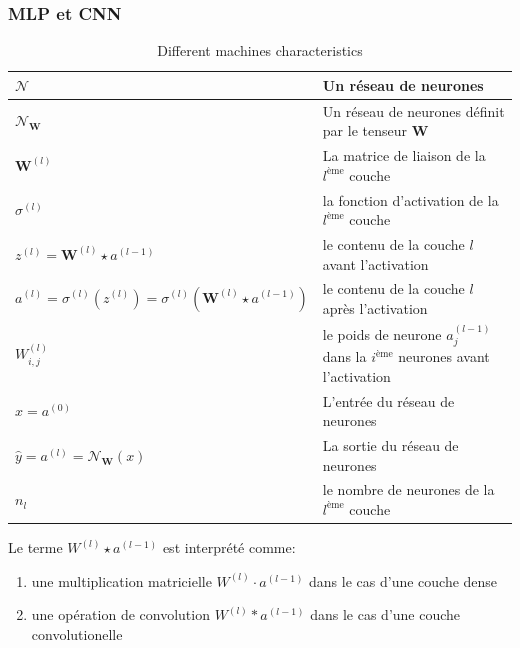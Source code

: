 \subsubsection{MLP et CNN}
\begin{table}[ht]
	\centering
	\begin{tabularx}{\textwidth}{| X | X |}
		
		\hline
		$\mathcal{N}$          & Un réseau de neurones \\ 
		\hline
		$\mathcal{N}_{\boldsymbol{W}}$          & Un réseau de neurones définit par le tenseur $\boldsymbol{W}$      \\ \hline
		$\boldsymbol{W}^{(l)}$          & La matrice de liaison de la $l^\text{ème}$ couche         \\
		\hline
		$\sigma^{(l)}$& la fonction d'activation de la $l^\text{ème}$ couche \\
				\hline
		$z^{(l)}=\boldsymbol{W}^{(l)}\star a^{(l-1)}$ & le contenu de la couche $l$ avant l'activation\\
		\hline
		$a^{(l)}=\sigma^{(l)}({z^{(l)}})=\sigma^{(l)}(\boldsymbol{W}^{(l)}\star a^{(l-1)})$ & le contenu de la couche $l$ après l'activation \\
		\hline
		$W^{(l)}_{i,j}$                 & le poids de neurone $a^{(l-1)}_{j}$ dans la $i^\text{ème}$ neurones avant l'activation           \\ \hline
		$x=a^{(0)}$                    & L'entrée du réseau de neurones          \\ \hline
		$\hat{y}=a^{(l)}=\mathcal{N}_{\boldsymbol{W}}(x)$              & La sortie du réseau de neurones  \\ \hline
		$n_l$ & le nombre de neurones de la $l^\text{ème}$ couche \\ 
		 \hline 
		
	\end{tabularx}
	\caption{Different machines characteristics}
	\label{table:AcyclicNeuralNetwork}
	\begin{remark}
		Le terme $W^{(l)} \star a^{(l-1)}$ est  interprété comme:
		\begin{enumerate}
			\item une multiplication matricielle $W^{(l)}\cdot a^{(l-1)}$ dans le cas d'une couche dense
			\item une opération de convolution $W^{(l)}* a^{(l-1)}$ dans le cas d'une couche convolutionelle
		\end{enumerate}
		 
	\end{remark}
\end{table}
\FloatBarrier


